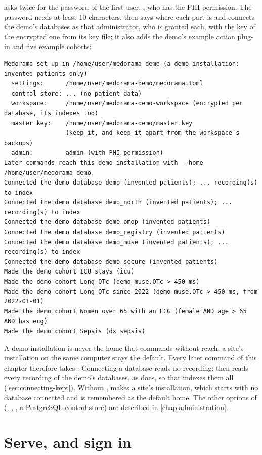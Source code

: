  asks twice for the password of the first user, , who has the PHI
permission. The password needs at least 10 characters.  then says where each part is
and connects the demo's databases as that administrator, who is granted each, with the key of
the encrypted one from its key file; it also adds the demo's example action plug-in and five
example cohorts:
\begin{lstlisting}[style=text]
Medorama set up in /home/user/medorama-demo (a demo installation: invented patients only)
  settings:      /home/user/medorama-demo/medorama.toml
  control store: ... (no patient data)
  workspace:     /home/user/medorama-demo-workspace (encrypted per database, its indexes too)
  master key:    /home/user/medorama-demo/master.key
                 (keep it, and keep it apart from the workspace's backups)
  admin:         admin (with PHI permission)
Later commands reach this demo installation with --home /home/user/medorama-demo.
Connected the demo database demo (invented patients); ... recording(s) to index
Connected the demo database demo_north (invented patients); ... recording(s) to index
Connected the demo database demo_omop (invented patients)
Connected the demo database demo_registry (invented patients)
Connected the demo database demo_muse (invented patients); ... recording(s) to index
Connected the demo database demo_secure (invented patients)
Made the demo cohort ICU stays (icu)
Made the demo cohort Long QTc (demo_muse.QTc > 450 ms)
Made the demo cohort Long QTc since 2022 (demo_muse.QTc > 450 ms, from 2022-01-01)
Made the demo cohort Women over 65 with an ECG (female AND age > 65 AND has ecg)
Made the demo cohort Sepsis (dx sepsis)
\end{lstlisting}
A demo installation is never the home that commands without  reach: a site's
installation on the same computer stays the default. Every later command of this chapter
therefore takes .
Connecting a database reads no recording;  then reads every recording of the
demo's databases, as  does, so that  indexes them all
(\cref{sec:connecting-kept}). Without ,  makes a site's installation,
which starts with no database connected and is remembered as the default home. The other options of
 (, , , a PostgreSQL
control store) are described in \cref{chap:administration}.

\section{Serve, and sign in}
\label{sec:quickstart-serve}

